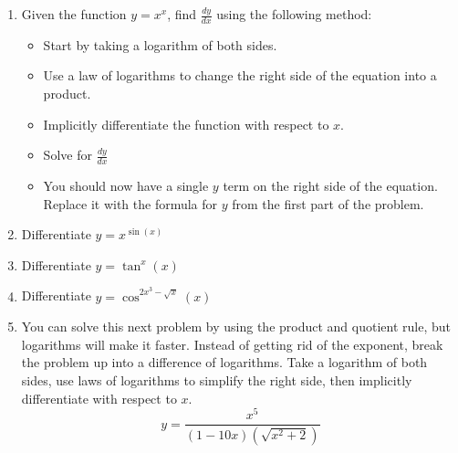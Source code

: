 \documentclass{article}
\begin{document}
\begin{enumerate}
\item Given the function $y = x^x$, find $\frac{dy}{dx}$ using the following method:
\begin{itemize}
\item Start by taking a logarithm of both sides.
\item Use a law of logarithms to change the right side of the equation into a product.
\item Implicitly differentiate the function with respect to $x$.
\item Solve for $\frac{dy}{dx}$
\item You should now have a single $y$ term on the right side of the equation. Replace it with the formula for $y$ from the first part of the problem.
\end{itemize}
\item Differentiate $y = x^{\sin(x)}$
\item Differentiate $y = \tan^x(x)$
\item Differentiate $y = \cos^{2x^3 -\sqrt{x}}(x)$
\item You can solve this next problem by using the product and quotient rule, but logarithms will make it faster. Instead of getting rid of the exponent, break the problem up into a difference of logarithms. Take a logarithm of both sides, use laws of logarithms to simplify the right side, then implicitly differentiate with respect to $x$.
$$y = \frac{x^5}{(1-10x)(\sqrt{x^2+2})}$$
\end{enumerate}
\end{document}
